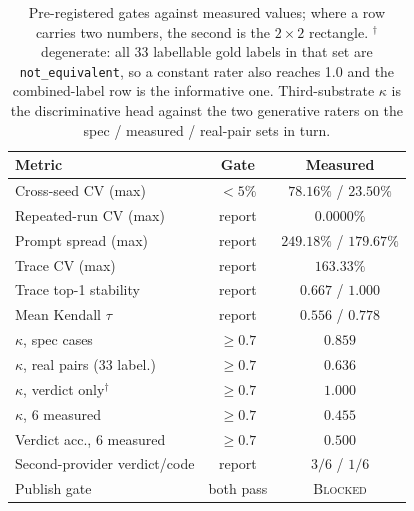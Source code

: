 \documentclass[sigconf,anonymous,nonacm]{acmart}
\begin{document}
\begin{table}[h]
\vspace{-0.6em}
\centering\scriptsize
\setlength{\tabcolsep}{3pt}
\begin{tabular}{lcc}
\toprule
\textbf{Metric} & \textbf{Gate} & \textbf{Measured} \\
\midrule
Cross-seed CV (max) & $<5\%$ & $78.16\%$ / $23.50\%$ \\
Repeated-run CV (max) & report & $0.0000\%$ \\
Prompt spread (max) & report & $249.18\%$ / $179.67\%$ \\
Trace CV (max) & report & $163.33\%$ \\
Trace top-1 stability & report & $0.667$ / $1.000$ \\
Mean Kendall $\tau$ & report & $0.556$ / $0.778$ \\
$\kappa$, spec cases & $\geq0.7$ & $0.859$ \\
$\kappa$, real pairs (33 label.) & $\geq0.7$ & $0.636$ \\
$\kappa$, verdict only$^{\dagger}$ & $\geq0.7$ & $1.000$ \\
$\kappa$, 6 measured & $\geq0.7$ & $0.455$ \\
Verdict acc., 6 measured & $\geq0.7$ & $0.500$ \\
Second-provider verdict/code & report & $3/6$ / $1/6$ \\
\midrule
Publish gate & both pass & \textsc{Blocked} \\
\bottomrule
\end{tabular}
\vspace{-0.8em}
\caption{Pre-registered gates against measured values; where a row carries two numbers, the second is the $2\times2$ rectangle. $^{\dagger}$degenerate: all 33 labellable gold labels in that set are \texttt{not\_equivalent}, so a constant rater also reaches 1.0 and the combined-label row is the informative one. Third-substrate $\kappa$ is the discriminative head against the two generative raters on the spec / measured / real-pair sets in turn.}
\label{tab:metrics}
\end{table}
\end{document}
